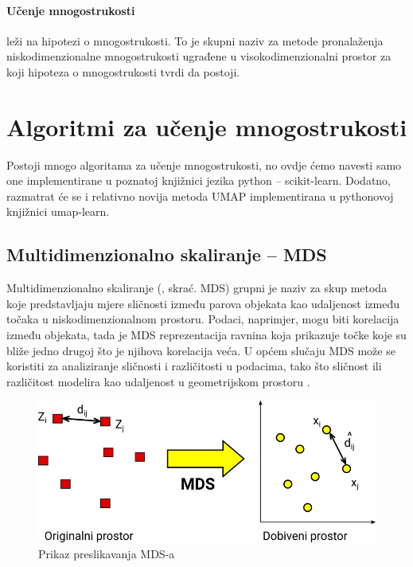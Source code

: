 \documentclass[times, utf8, diplomski]{fer}
\begin{document}
\paragraph{Učenje mnogostrukosti} leži na hipotezi o mnogostrukosti. To je skupni naziv za metode pronalaženja niskodimenzionalne mnogostrukosti ugrađene u visokodimenzionalni prostor za koji hipoteza o mnogostrukosti tvrdi da postoji.

\section{Algoritmi za učenje mnogostrukosti}

Postoji mnogo algoritama za učenje mnogostrukosti, no ovdje ćemo navesti samo one implementirane u poznatoj knjižnici jezika python -- scikit-learn. Dodatno, razmatrat će se i relativno novija metoda UMAP implementirana u pythonovoj knjižnici umap-learn.

\subsection{Multidimenzionalno skaliranje -- MDS}

Multidimenzionalno skaliranje (, skrać. MDS) grupni je naziv za skup metoda koje predstavljaju mjere sličnosti između parova objekata kao udaljenost između točaka u niskodimenzionalnom prostoru. Podaci, naprimjer, mogu biti korelacija između objekata, tada je MDS reprezentacija ravnina koja prikazuje točke koje su bliže jedno drugoj što je njihova korelacija veća. U općem slučaju MDS može se koristiti za analiziranje sličnosti i različitosti u podacima, tako što sličnost ili različitost modelira kao udaljenost u geometrijskom prostoru \citep{borg2005modern}.

\begin{figure}[htb]
    \centering
    \includegraphics[width=12cm]{resources/images/reduction/mds_mapping.png}
    \caption{Prikaz preslikavanja MDS-a}
    \label{fig:mds_mapping}
\end{figure}
\end{document}

